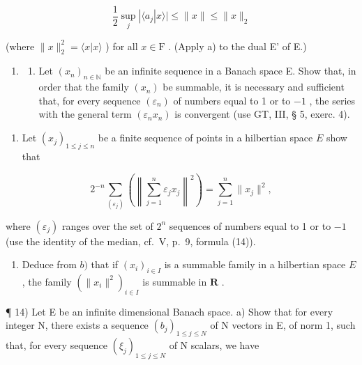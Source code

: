 \[
\frac {1}{2} \sup _ {j} | \langle a _ {j} | x \rangle | \leqslant \| x \| \leqslant \| x \| _ {2}
\]

(where \(\| x\| _2^2 = \langle x|x\rangle\) ) for all \(x\in \mathrm{F}\) . (Apply a) to the dual E' of E.)

\begin{enumerate}
\def\labelenumi{\arabic{enumi})}
\setcounter{enumi}{12}
\tightlist
\item
  \begin{enumerate}
  \def\labelenumii{\alph{enumii})}
  \tightlist
  \item
    Let \((x_{n})_{n\in \mathbb{N}}\) be an infinite sequence in a Banach space E. Show that, in order that the family \((x_{n})\) be summable, it is necessary and sufficient that, for every sequence \((\varepsilon_{n})\) of numbers equal to 1 or to \(-1\) , the series with the general term \((\varepsilon_{n}x_{n})\) is convergent (use GT, III, § 5, exerc. 4).
  \end{enumerate}
\end{enumerate}

\begin{enumerate}
\def\labelenumi{\alph{enumi})}
\setcounter{enumi}{1}
\tightlist
\item
  Let \((x_{j})_{1\leqslant j\leqslant n}\) be a finite sequence of points in a hilbertian space \(E\) show that
\end{enumerate}

\[
2 ^ {- n} \sum_ {(\varepsilon_ {j})} \left(\left\| \sum_ {j = 1} ^ {n} \varepsilon_ {j} x _ {j} \right\| ^ {2}\right) = \sum_ {j = 1} ^ {n} \| x _ {j} \| ^ {2},
\]

where \((\varepsilon_{j})\) ranges over the set of \(2^{n}\) sequences of numbers equal to 1 or to \(-1\) (use the identity of the median, cf.~V, p.~9, formula (14)).

\begin{enumerate}
\def\labelenumi{\alph{enumi})}
\setcounter{enumi}{2}
\tightlist
\item
  Deduce from \(b)\) that if \((x_{i})_{i\in I}\) is a summable family in a hilbertian space \(E\) , the family \((\| x_i\|^2)_{i\in I}\) is summable in \(\mathbf{R}\) .
\end{enumerate}

¶ 14) Let E be an infinite dimensional Banach space. a) Show that for every integer N, there exists a sequence \((b_{j})_{1 \leqslant j \leqslant N}\) of N vectors in E, of norm 1, such that, for every sequence \((\xi_{j})_{1 \leqslant j \leqslant N}\) of N scalars, we have

